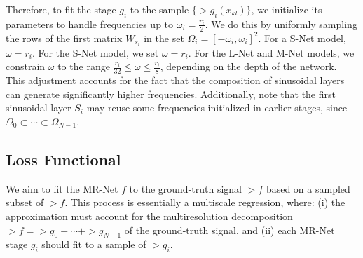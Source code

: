 Therefore, to fit the stage $g_i$ to the sample $\{\gt{g}_i(x_{kl})\}$, we initialize its parameters to handle frequencies up to $\omega_i = \frac{r_i}{2}$. We do this by uniformly sampling the rows of the first matrix $W_{s_i}$ in the set $\Omega_i = \left[-\omega_i, \omega_i\right]^2$. For a S-Net model, $\omega = r_i$. For the S-Net model, we set $\omega = r_i$. For the L-Net and M-Net models, we constrain $\omega$ to the range $\frac{r_i}{32} \leq \omega \leq \frac{r_i}{8}$, depending on the depth of the network. This adjustment accounts for the fact that the composition of sinusoidal layers can generate significantly higher frequencies. Additionally, note that the first sinusoidal layer $S_i$ may reuse some frequencies initialized in earlier stages, since $\Omega_0 \subset \cdots \subset \Omega_{N-1}$.





\subsection{Loss Functional}

We aim to fit the MR-Net $f$ to the ground-truth signal $\gt{f}$ based on a sampled subset of $\gt{f}$. This process is essentially a multiscale regression, where: (i) the approximation must account for the multiresolution decomposition $\gt{f} = \gt{g}_0 + \cdots + \gt{g}_{N-1}$ of the ground-truth signal, and (ii) each MR-Net stage $g_i$ should fit to a sample of $\gt{g}_i$.


